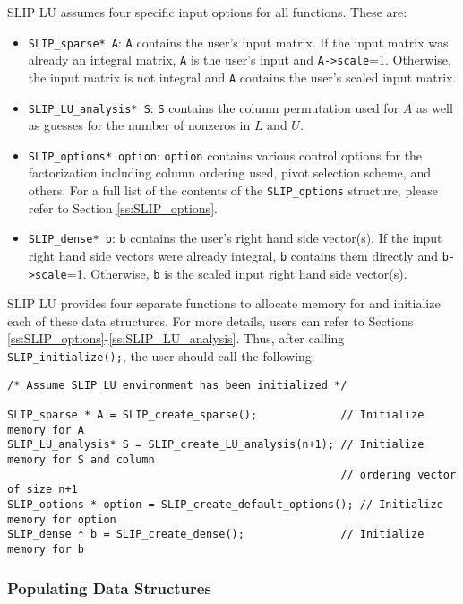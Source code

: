 \documentclass[11pt]{article}
\theoremstyle{definition}
\begin{document}
SLIP LU assumes four specific input options for all functions. These are:

\begin{itemize}
\item \verb|SLIP_sparse* A|: \verb|A| contains the user's input matrix. If the input matrix was already an integral matrix, \verb|A| is the user's input and \verb|A->scale|=1. Otherwise, the input matrix is not integral and \verb|A| contains the user's scaled input matrix.
\item \verb|SLIP_LU_analysis* S|: \verb|S| contains the column permutation used for $A$ as well as guesses for the number of nonzeros in $L$ and $U$.
\item \verb|SLIP_options* option|: \verb|option| contains various control options for the factorization including column ordering used, pivot selection scheme, and others. For a full list of the contents of the \verb|SLIP_options| structure, please refer to Section \ref{ss:SLIP_options}.
\item \verb|SLIP_dense* b|: \verb|b| contains the user's right hand side vector(s). If the input right hand side vectors were already integral, \verb|b| contains them directly and \verb|b->scale|=1. Otherwise, \verb|b| is the scaled input right hand side vector(s).
\end{itemize}

SLIP LU provides four separate functions to allocate memory for and initialize each of these data structures. For more details, users can refer to Sections \ref{ss:SLIP_options}-\ref{ss:SLIP_LU_analysis}. Thus, after calling \verb|SLIP_initialize();|, the user should call the following:

\begin{verbatim}
/* Assume SLIP LU environment has been initialized */

SLIP_sparse * A = SLIP_create_sparse();             // Initialize memory for A
SLIP_LU_analysis* S = SLIP_create_LU_analysis(n+1); // Initialize memory for S and column
                                                    // ordering vector of size n+1
SLIP_options * option = SLIP_create_default_options(); // Initialize memory for option
SLIP_dense * b = SLIP_create_dense();               // Initialize memory for b

\end{verbatim}

\subsubsection{Populating Data Structures}
\end{document}
